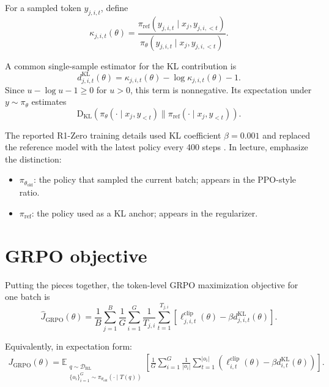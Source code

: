 \documentclass[11pt]{article}
\newcommand{\D}{\mathcal{D}}
\newcommand{\E}{\mathbb{E}}
\newcommand{\KL}{\mathrm{D}_{\mathrm{KL}}}
\newcommand{\old}{\mathrm{old}}
\newcommand{\refm}{\mathrm{ref}}
\newcommand{\RL}{\mathrm{RL}}
\newcommand{\GRPO}{\mathrm{GRPO}}
\begin{document}
For a sampled token $y_{j,i,t}$, define
\begin{equation}
\kappa_{j,i,t}(\theta)
=\frac{\pi_{\refm}(y_{j,i,t}\mid x_j,y_{j,i,<t})}
{\pi_\theta(y_{j,i,t}\mid x_j,y_{j,i,<t})}.
\end{equation}

A common single-sample estimator for the KL contribution is
\begin{equation}
d^{\mathrm{KL}}_{j,i,t}(\theta)
=\kappa_{j,i,t}(\theta)-\log \kappa_{j,i,t}(\theta)-1.
\label{eq:kl_estimator}
\end{equation}
Since $u-\log u-1\ge 0$ for $u>0$, this term is nonnegative. Its expectation under $y\sim \pi_\theta$ estimates
\begin{equation}
\KL(\pi_\theta(\cdot\mid x_j,y_{<t})\|\pi_{\refm}(\cdot\mid x_j,y_{<t})).
\end{equation}

The reported R1-Zero training details used KL coefficient $\beta=0.001$ and replaced the reference model with the latest policy every 400 steps \cite{guo2025nature}. In lecture, emphasize the distinction:
\begin{itemize}[leftmargin=*]
  \item $\pi_{\theta_{\old}}$: the policy that sampled the current batch; appears in the PPO-style ratio.
  \item $\pi_{\refm}$: the policy used as a KL anchor; appears in the regularizer.
\end{itemize}

\section{GRPO objective}

Putting the pieces together, the token-level GRPO maximization objective for one batch is
\begin{equation}
\widehat{J}_{\GRPO}(\theta)
=\frac{1}{B}\sum_{j=1}^{B}
\frac{1}{G}\sum_{i=1}^{G}
\frac{1}{T_{j,i}}\sum_{t=1}^{T_{j,i}}
\left[
\ell^{\mathrm{clip}}_{j,i,t}(\theta)
-\beta d^{\mathrm{KL}}_{j,i,t}(\theta)
\right].
\label{eq:grpo_empirical}
\end{equation}

Equivalently, in expectation form:
\begin{align}
J_{\GRPO}(\theta)
=\E_{\substack{q\sim \D_{\RL}\\
\{o_i\}_{i=1}^{G}\sim \pi_{\theta_{\old}}(\cdot\mid T(q))}}
\left[
\frac{1}{G}\sum_{i=1}^{G}\frac{1}{|o_i|}\sum_{t=1}^{|o_i|}
\left(
\ell^{\mathrm{clip}}_{i,t}(\theta)-\beta d^{\mathrm{KL}}_{i,t}(\theta)
\right)
\right].
\end{align}
\end{document}
